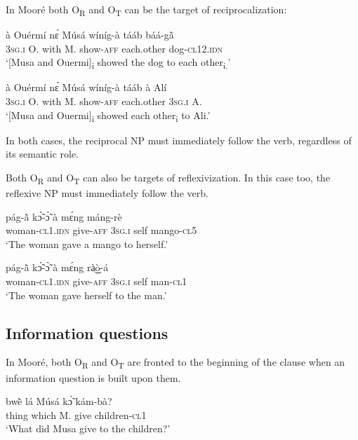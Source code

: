 \documentclass[output=paper]{langsci/langscibook}
\begin{document}
In Mooré both O\textsubscript{R}  and O\textsubscript{T}  can be the target of reciprocalization:

\ea
\label{ex:41.pacchiarotti}
\gll à    Ouérmí  nɛ́  Músá  wíníg-à  tááb    báá-g\`{ã} \\
\textsc{3sg.i}    O.    with  M.  show-\textsc{aff}  each.other  dog-\textsc{cl12.idn}\\
\glt `[Musa and Ouermi]\textsubscript{i} showed the dog to each other\textsubscript{i.}'
\z

\ea
\label{ex:42.pacchiarotti}
\gll à    Ouérmí  nɛ́  Músá  wíníg-à  tááb    à    Alí\\
\textsc{3sg.i}    O.    with  M.  show-\textsc{aff}  each.other  \textsc{3sg.i}     A.\\
\glt `[Musa and Ouermi]\textsubscript{i} showed each other\textsubscript{i} to Ali.'
\z

In both cases, the reciprocal NP must immediately follow the verb, regardless of its semantic role. 

Both O\textsubscript{R} and O\textsubscript{T} can also be targets of reflexivization. In this case too, the reflexive NP must immediately follow the verb.

\ea
\label{ex:43.pacchiarotti}
\gll pág-\`{ã} kɔ̃́-ɔ̃̀ à mɛ́ng máng-rè\\
woman-\textsc{cl1.idn}  give-\textsc{aff}  \textsc{3sg.i}    self  mango-\textsc{cl5}\\
\glt `The woman gave a mango to herself.'
\z

\ea
\label{ex:44.pacchiarotti}
\gll pág-\`{ã} kɔ̃́-ɔ̃̀ à mɛ́ng rà͜ò-á \\
woman-\textsc{cl1.idn}  give-\textsc{aff}  \textsc{3sg.i}    self  man-\textsc{cl1}\\
\glt `The woman gave herself to the man.'
\z

\subsection{Information questions}\label{§5.5:Information.pacchiarotti}

In Mooré, both O\textsubscript{R} and O\textsubscript{T} are fronted to the beginning of the clause when an information question is built upon them. 

\ea
\label{ex:45.pacchiarotti}
\gll bw\`{ẽ}    lá    Músá  kɔ̃́  kám-bà?  \\
thing    which    M.  give  children-\textsc{cl1}\\
\glt `What did Musa give to the children?'
\z
\end{document}

